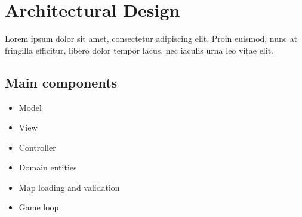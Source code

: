 \chapter{Architectural Design}
Lorem ipsum dolor sit amet, consectetur adipiscing elit. Proin euismod, nunc at
fringilla efficitur, libero dolor tempor lacus, nec iaculis urna leo vitae
elit.

\section{Main components}
\begin{itemize}[leftmargin=*]
  \item Model
  \item View
  \item Controller
  \item Domain entities
  \item Map loading and validation
  \item Game loop
\end{itemize}
